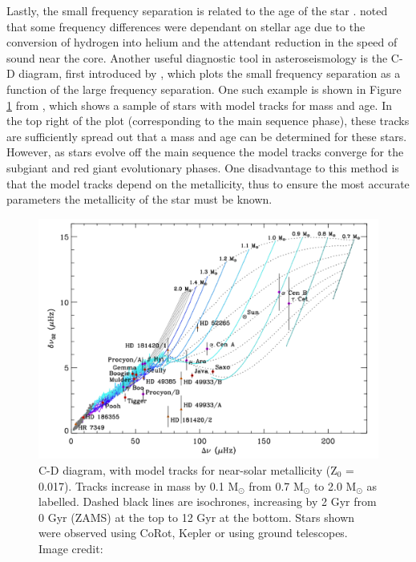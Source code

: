 Lastly, the small frequency separation is related to the age of the star \citep{Ulrich_1986}. \citet{Christensen_Dalsgaard_1984} noted that some frequency differences were dependant on stellar age due to the conversion of hydrogen into helium and the attendant reduction in the speed of sound near the core. Another useful diagnostic tool in asteroseismology is the C-D diagram, first introduced by \citet{Christensen_Dalsgaard_1984}, which plots the small frequency separation as a function of the large frequency separation. One such example is shown in Figure \ref{fig:CD_diagram_example} from \citet{White_etal_2011}, which shows a sample of stars with model tracks for mass and age. In the top right of the plot (corresponding to the main sequence phase), these tracks are sufficiently spread out that a mass and age can be determined for these stars. However, as stars evolve off the main sequence the model tracks converge for the subgiant and red giant evolutionary phases. One disadvantage to this method is that the model tracks depend on the metallicity, thus to ensure the most accurate parameters the metallicity of the star must be known.

\begin{figure}
    \centering
    \includegraphics[scale=0.4]{Figures/1-Introduction/C-D_diagram.pdf}
    \caption[C-D diagram that can be used to age stars from asteroseismic parameters]{C-D diagram, with model tracks for near-solar metallicity (Z$_{0}$ = 0.017). Tracks increase in mass by 0.1 M$_{\odot}$ from 0.7 M$_{\odot}$ to 2.0 M$_{\odot}$ as labelled. Dashed black lines are isochrones, increasing by 2 Gyr from 0 Gyr (ZAMS) at the top to 12 Gyr at the bottom. Stars shown were observed using CoRot, Kepler or using ground telescopes. Image credit: \citet{White_etal_2011}}
    \label{fig:CD_diagram_example}
\end{figure}

